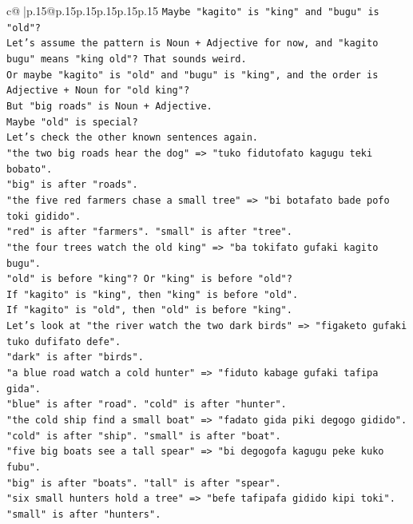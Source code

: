 \documentclass{article}
\begin{document}
{\begin{supertabular}{c@{$\;$}|p{.15\linewidth}@{}p{.15\linewidth}p{.15\linewidth}p{.15\linewidth}p{.15\linewidth}p{.15\linewidth}}
{{{\texttt{Maybe "kagito" is "king" and "bugu" is "old"?} \\
\texttt{Let's assume the pattern is Noun + Adjective for now, and "kagito bugu" means "king old"? That sounds weird.} \\
\texttt{Or maybe "kagito" is "old" and "bugu" is "king", and the order is Adjective + Noun for "old king"?} \\
\texttt{But "big roads" is Noun + Adjective.} \\
\texttt{Maybe "old" is special?} \\
\texttt{Let's check the other known sentences again.} \\
\texttt{"the two big roads hear the dog" => "tuko fidutofato kagugu teki bobato".} \\
\texttt{"big" is after "roads".} \\
\texttt{"the five red farmers chase a small tree" => "bi botafato bade pofo toki gidido".} \\
\texttt{"red" is after "farmers". "small" is after "tree".} \\
\texttt{"the four trees watch the old king" => "ba tokifato gufaki kagito bugu".} \\
\texttt{"old" is before "king"? Or "king" is before "old"?} \\
\texttt{If "kagito" is "king", then "king" is before "old".} \\
\texttt{If "kagito" is "old", then "old" is before "king".} \\
\texttt{Let's look at "the river watch the two dark birds" => "figaketo gufaki tuko dufifato defe".} \\
\texttt{"dark" is after "birds".} \\
\texttt{"a blue road watch a cold hunter" => "fiduto kabage gufaki tafipa gida".} \\
\texttt{"blue" is after "road". "cold" is after "hunter".} \\
\texttt{"the cold ship find a small boat" => "fadato gida piki degogo gidido".} \\
\texttt{"cold" is after "ship". "small" is after "boat".} \\
\texttt{"five big boats see a tall spear" => "bi degogofa kagugu peke kuko fubu".} \\
\texttt{"big" is after "boats". "tall" is after "spear".} \\
\texttt{"six small hunters hold a tree" => "befe tafipafa gidido kipi toki".} \\
\texttt{"small" is after "hunters".} \\
}}}
\end{supertabular}}
\end{document}
